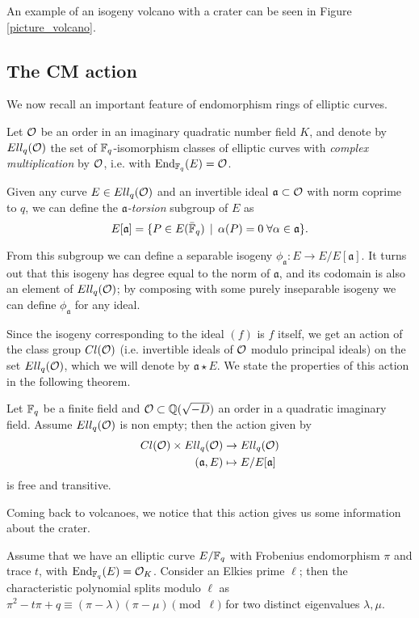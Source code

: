 An example of an isogeny volcano with a crater can be seen in Figure \ref{picture_volcano}.

\subsection{The CM action}
We now recall an important feature of endomorphism rings of elliptic curves.

Let $\mathcal{O}$ be an order in an imaginary quadratic number field $K$, and denote by $Ell_q(\mathcal{O})$ the set of $\mathbb{F}_q$-isomorphism classes of elliptic curves with \emph{complex multiplication} by $\mathcal{O}$, i.e. with $\operatorname{End}_{\mathbb{F}_q}(E)=\mathcal{O}$.

Given any curve $E\in Ell_q(\mathcal{O})$ and an invertible ideal $\mathfrak{a}\subset\mathcal{O}$ with norm coprime to $q$, we can define the \emph{$\mathfrak{a}$-torsion} subgroup of $E$ as $$E[\mathfrak{a}]=\{ P\in E(\bar{\mathbb{F}}_q) \operatorname{\; |\;} \alpha(P)=0\;\forall\alpha\in\mathfrak{a} \}.$$

From this subgroup we can define a separable isogeny $\phi_{\mathfrak{a}}: E\to E/E[\mathfrak{a}]$. It turns out that this isogeny has degree equal to the norm of $\mathfrak{a}$, and its codomain is also an element of $Ell_q(\mathcal{O})$; by composing with some purely inseparable isogeny we can define $\phi_{\mathfrak{a}}$ for any ideal.

Since the isogeny corresponding to the ideal $(f)$ is $f$ itself, we get an action of the class group $Cl(\mathcal{O})$ (i.e. invertible ideals of $\mathcal{O}$ modulo principal ideals) on the set $Ell_q(\mathcal{O})$, which we will denote by $\mathfrak{a}\star E$. We state the properties of this action in the following theorem.

\begin{theorem}
    Let $\mathbb{F}_q$ be a finite field and $\mathcal{O}\subset\mathbb{Q}(\sqrt{-D})$ an order in a quadratic imaginary field. Assume $Ell_q(\mathcal{O})$ is non empty; then the action given by
    \begin{align*}
    Cl(\mathcal{O})\times Ell_q(\mathcal{O}) & \to  Ell_q(\mathcal{O})\\
    (\mathfrak{a}, E) & \mapsto  E/E[\mathfrak{a}]
    \end{align*}
    is free and transitive.
\end{theorem}

Coming back to volcanoes, we notice that this action gives us some information about the crater.

Assume that we have an elliptic curve $E/\mathbb{F}_q$ with Frobenius endomorphism $\pi$ and trace $t$, with $\operatorname{End}_{\mathbb{F}_q}(E)=\mathcal{O}_K$. Consider an Elkies prime $\ell$; then the characteristic polynomial splits modulo $\ell$ as $\pi^2-t\pi+q\equiv(\pi-\lambda)(\pi-\mu)\pmod\ell$ for two distinct eigenvalues $\lambda,\mu$.

